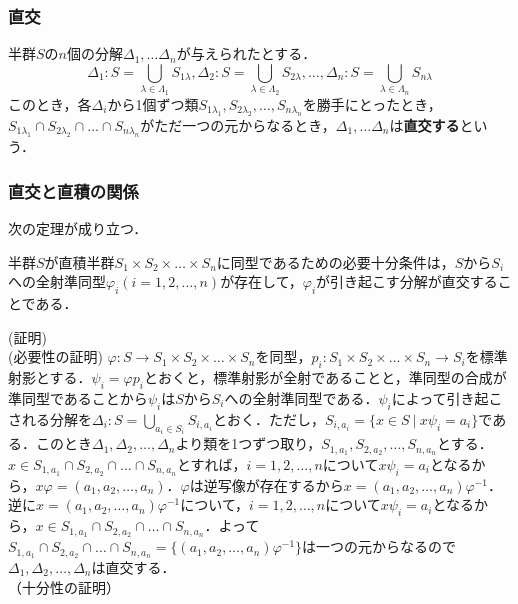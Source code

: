 \documentclass{jsarticle}
\begin{document}
\subsubsection{直交}
半群$S$の$n$個の分解$\Delta_1,\dots\Delta_n$が与えられたとする．
$$
\Delta_1:S=\displaystyle\bigcup_{\lambda\in\Lambda_1}S_{1\lambda},\Delta_2:S=\displaystyle\bigcup_{\lambda\in\Lambda_2}S_{2\lambda},\dots,\Delta_n:S=\displaystyle\bigcup_{\lambda\in\Lambda_n} S_{n\lambda}
$$
このとき，各$\Delta_i$から1個ずつ類$S_{1\lambda_1},S_{2\lambda_2},\dots,S_{n\lambda_n}$を勝手にとったとき，$S_{1\lambda_1}\cap S_{2\lambda_2}\cap\dots\cap S_{n\lambda_n}$がただ一つの元からなるとき，$\Delta_1,\dots\Delta_n$は{\bf 直交する}という．
\subsubsection{直交と直積の関係}
次の定理が成り立つ．
\begin{thm}
半群$S$が直積半群$S_1\times S_2\times\dots \times S_n$に同型であるための必要十分条件は，$S$から$S_i$への全射準同型$\varphi_i(i=1,2,\dots,n)$が存在して，$\varphi_i$が引き起こす分解が直交することである．
\end{thm}
(証明)\\
(必要性の証明)
$\varphi:S\rightarrow S_1\times S_2\times\dots\times S_n$を同型，$p_i:S_1\times S_2\times\dots\times S_n\rightarrow S_i$を標準射影とする．$\psi_i=\varphi p_i$とおくと，標準射影が全射であることと，準同型の合成が準同型であることから$\psi_i$は$S$から$S_i$への全射準同型である．$\psi_i$によって引き起こされる分解を$\Delta_i:S=\displaystyle\bigcup_{a_i\in S_i}S_{i,a_i}$とおく．ただし，$S_{i,a_i}=\{x\in S\:|\:x\psi_i=a_i\}$である．このとき$\Delta_1,\Delta_2,\dots,\Delta_n$より類を1つずつ取り，$S_{1,a_1},S_{2,a_2},\dots,S_{n,a_n}$とする．$x\in S_{1,a_1}\cap S_{2,a_2}\cap\dots\cap S_{n,a_n}$とすれば，$i=1,2,\dots,n$について$x\psi_i=a_i$となるから，$x\varphi=(a_1,a_2,\dots,a_n)$．$\varphi$は逆写像が存在するから$x=(a_1,a_2,\dots,a_n)\varphi^{-1}$．逆に$x=(a_1,a_2,\dots,a_n)\varphi^{-1}$について，$i=1,2,\dots,n$について$x\psi_i=a_i$となるから，$x\in S_{1,a_1}\cap S_{2,a_2}\cap\dots\cap S_{n,a_n}$．よって$S_{1,a_1}\cap S_{2,a_2}\cap\dots\cap S_{n,a_n}=\{(a_1,a_2,\dots,a_n)\varphi^{-1}\}$は一つの元からなるので$\Delta_1,\Delta_2,\dots,\Delta_n$は直交する．\\
（十分性の証明）
\end{document}
